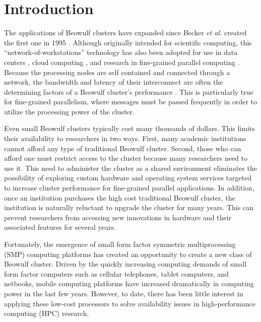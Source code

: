 \documentclass[11pt]{book}
\begin{document}
\clearpage
{}
\setcounter{page}{1}

\chapter{Introduction}\label{introduction}

The applications of Beowulf clusters have expanded since Becker \emph{et al.} created the
first one in 1995 \cite{becker-95}.  Although originally intended for scientific
computing, this ``network-of-workstations'' technology has also been adopted for use in
data centers \cite{liu-13}, cloud computing \cite{trivedi-11}, and research in
fine-grained parallel computing \cite{aad-03}.  Because the processing nodes are self
contained and connected through a network, the bandwidth and latency of their interconnect
are often the determining factors of a Beowulf cluster's performance
\cite{becker-95,lancaster-10}.  This is particularly true for fine-grained parallelism,
where messages must be passed frequently in order to utilize the processing power of the
cluster.

Even small Beowulf clusters typically cost many thousands of dollars.  This limits their
availability to researchers in two ways.  First, many academic institutions cannot afford
any type of traditional Beowulf cluster.  Second, those who can afford one must restrict
access to the cluster because many researchers need to use it.  This need to administer
the cluster as a shared environment eliminates the possibility of exploring custom
hardware and operating system services targeted to increase cluster performance for
fine-grained parallel applications.  In addition, once an institution purchases the high
cost traditional Beowulf cluster, the institution is naturally reluctant to upgrade the
cluster for many years.  This can prevent researchers from accessing new innovations in
hardware and their associated features for several years.

Fortunately, the emergence of small form factor symmetric multiprocessing (SMP) computing
platforms has created an opportunity to create a new class of Beowulf cluster.  Driven by
the quickly increasing computing demands of small form factor computers such as cellular
telephones, tablet computers, and netbooks, mobile computing platforms have increased
dramatically in computing power in the last few years.  However, to date, there has been
little interest in applying these low-cost processors to solve availability issues in
high-performance computing (HPC) research.
\end{document}
